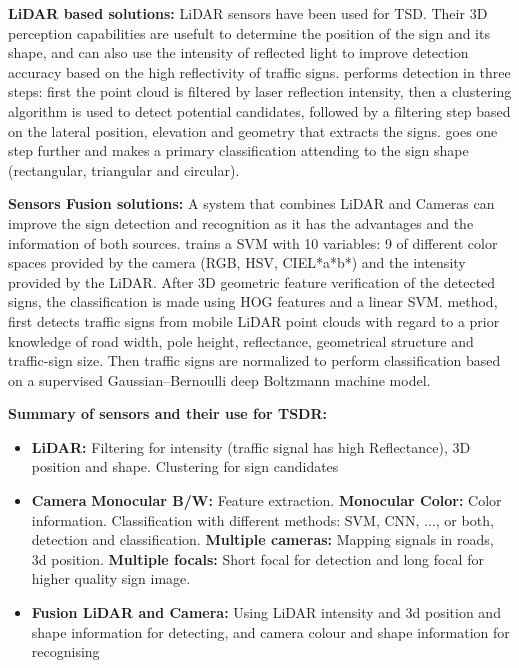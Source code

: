 \begin{flushleft} \textbf{LiDAR based solutions:}
LiDAR sensors have been used for TSD. Their 3D perception capabilities are 
usefult to determine the position of the sign and its shape, and can also use 
the intensity of reflected light to improve detection accuracy based on the
high reflectivity of traffic signs. \cite{gargoum2017automated} 
performs detection in three steps: first the point cloud is filtered by 
laser reflection intensity, then a clustering algorithm is used to detect 
potential candidates, followed by a filtering step based on the lateral 
position, elevation and geometry that extracts the signs. 
\cite{weng2016road} goes one step further and makes a primary 
classification attending to the sign shape (rectangular, triangular and 
circular).
\end{flushleft}

\begin{flushleft} \textbf{Sensors Fusion solutions:}
A system that combines LiDAR and Cameras can improve the sign detection and 
recognition as it has the advantages and the information of both sources. 
\cite{zhou2014lidar} trains a SVM with 10 variables: 9 of different color 
spaces provided by the camera (RGB, HSV, CIEL*a*b*) and the intensity provided 
by the LiDAR. After 3D geometric feature verification of the detected signs, 
the classification is made using HOG features and a linear SVM. 
\cite{guan2018robust} method, first detects traffic signs from mobile LiDAR 
point clouds with regard to a prior knowledge of road width, pole height, 
reflectance, geometrical structure and traffic-sign size. Then traffic signs 
are normalized to perform classification based on a supervised 
Gaussian–Bernoulli deep Boltzmann machine model.
\end{flushleft}

\newpage
\begin{flushleft}
\textbf{Summary of sensors and their use for TSDR:}
\begin{itemize}[leftmargin=20mm,labelsep=5.8mm]
\item \textbf{LiDAR:} Filtering for intensity (traffic signal has high Reflectance), 3D position and shape. Clustering for sign candidates
\item \textbf{Camera}
\subitem \textbf{Monocular B/W:} Feature extraction.
\subitem \textbf{Monocular Color:} Color information. Classification with 
different methods: SVM, CNN, ..., or both, detection and classification.
\subitem \textbf{Multiple cameras:} Mapping signals in roads, 3d position.
\subitem \textbf{Multiple focals:} Short focal for detection and long focal for higher quality sign image.
\item \textbf{Fusion LiDAR and Camera:} Using LiDAR intensity and 3d position and shape information for detecting, and camera colour and shape information for recognising
\end{itemize}
\end{flushleft}

